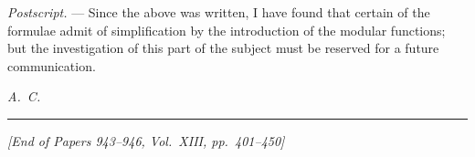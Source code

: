 \documentclass[12pt,a4paper]{article}
\theoremstyle{plain}
\begin{document}
\medskip

\noindent\textit{Postscript.} --- Since the above was written, I have found that certain of the formulae admit of simplification by the introduction of the modular functions; but the investigation of this part of the subject must be reserved for a future communication.

\vspace{1cm}
\begin{flushright}
\textit{A.~C.}
\end{flushright}

\vfill
\begin{center}
\rule{0.5\textwidth}{0.4pt}

\smallskip
\textit{[End of Papers 943--946, Vol.~XIII, pp.~401--450]}
\end{center}
\end{document}
